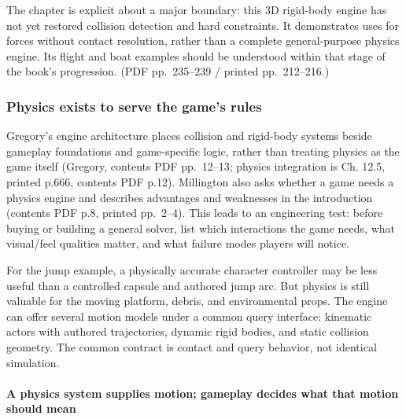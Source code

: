 The chapter is explicit about a major boundary: this 3D rigid-body engine has not yet restored collision detection and hard constraints. It demonstrates uses for forces without contact resolution, rather than a complete general-purpose physics engine. Its flight and boat examples should be understood within that stage of the book's progression. (PDF pp.~235--239 / printed pp.~212--216.)

\subsubsection{Physics exists to serve the game's rules}\label{06-engine-ii-ch033-physics-exists-to-serve-the-games-rules}

\hypertarget{06-engine-ii-ch033-physics-exists-to-serve-the-games-rules}{}

Gregory's engine architecture places collision and rigid-body systems beside gameplay foundations and game-specific logic, rather than treating physics as the game itself (Gregory, contents PDF pp.~12--13; physics integration is Ch. 12.5, printed p.666, contents PDF p.12). Millington also asks whether a game needs a physics engine and describes advantages and weaknesses in the introduction (contents PDF p.8, printed pp.~2--4). This leads to an engineering test: before buying or building a general solver, list which interactions the game needs, what visual/feel qualities matter, and what failure modes players will notice.

For the jump example, a physically accurate character controller may be less useful than a controlled capsule and authored jump arc. But physics is still valuable for the moving platform, debris, and environmental props. The engine can offer several motion models under a common query interface: kinematic actors with authored trajectories, dynamic rigid bodies, and static collision geometry. The common contract is contact and query behavior, not identical simulation.

\paragraph{A physics system supplies motion; gameplay decides what that motion should mean}\label{06-engine-ii-ch033-a-physics-system-supplies-motion-gameplay-decides-what-that-motion-should-mean}

\hypertarget{06-engine-ii-ch033-a-physics-system-supplies-motion-gameplay-decides-what-that-motion-should-mean}{}

